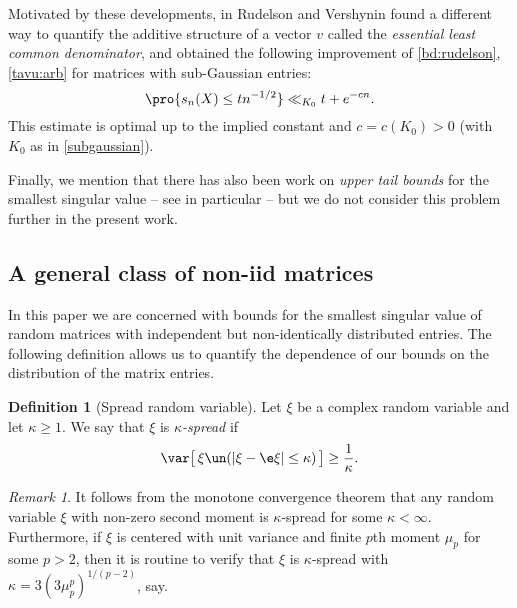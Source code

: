 \documentclass[aop,preprint]{imsart}
\theoremstyle{plain}
\theoremstyle{definition}
\newtheorem{definition}[theorem]{Definition}
\theoremstyle{remark}
\newtheorem{remark}[theorem]{Remark}
\numberwithin{equation}{section}
\numberwithin{theorem}{section}
\begin{document}
Motivated by these developments, in \cite{RuVe:ilo} Rudelson and Vershynin found a different way to quantify the additive structure of a vector $v$ called the \emph{essential least common denominator}, and obtained the following improvement of \eqref{bd:rudelson}, \eqref{tavu:arb} for matrices with sub-Gaussian entries:
\begin{equation}	\label{bd:ruve_exp}
\pro{ s_n(X) \le tn^{-1/2}} \ll_{K_0} t + e^{-cn}.
\end{equation}
This estimate is optimal up to the implied constant and $c=c(K_0)>0$ (with $K_0$ as in \eqref{subgaussian}). %

Finally, we mention that there has also been work on \emph{upper tail bounds} for the smallest singular value -- see in particular \cite{RuVe:uppertail, NgVu:normal} -- but we do not consider this problem further in the present work.


\subsection{A general class of non-iid matrices}

In this paper we are concerned with bounds for the smallest singular value of random matrices with independent but non-identically distributed entries.
The following definition allows us to quantify the dependence of our bounds on the distribution of the matrix entries.

\begin{definition}[Spread random variable]		\label{def:spread}
Let $\xi$ be a complex random variable and let $\kappa\ge 1$. 
We say that $\xi$ is \emph{$\kappa$-spread} if 
\begin{equation}	\label{def:kappa0}
\var \big[\,\xi\un(|\xi-\e\xi|\le \kappa)\,\big] \ge \frac1\kappa.
\end{equation}
\end{definition}

\begin{remark}	\label{rmk:kappap}
It follows from the monotone convergence theorem that any random variable $\xi$ with non-zero second moment is $\kappa$-spread for some $\kappa<\infty$.
Furthermore, if $\xi$ is centered with unit variance and finite $p$th moment $\mu_p$ for some $p>2$, then it is routine to verify that $\xi$ is $\kappa$-spread with $\kappa =3 (3\mu_p^p)^{1/(p-2)}$, say.
\end{remark}
\end{document}
